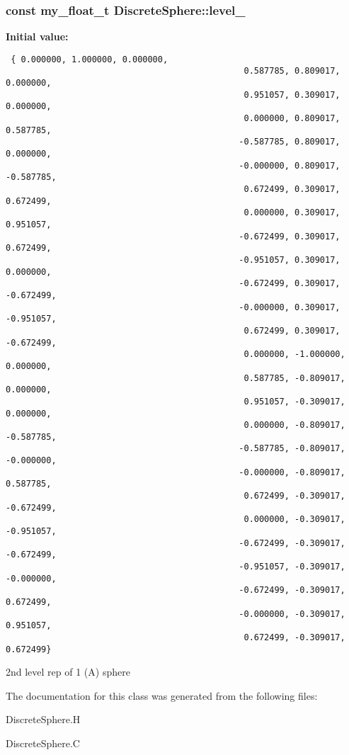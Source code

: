 \subsubsection{\setlength{\rightskip}{0pt plus 5cm}const my\_\-float\_\-t \bf{Discrete\-Sphere::level\_}\hspace{0.3cm}{\tt  [static, private]}}\label{classASCbase_1_1DiscreteSphere_e3e514caf92b337aae7cb629d90f9a61}


\textbf{Initial value:}

\begin{Code}\begin{verbatim} { 0.000000, 1.000000, 0.000000,
                                               0.587785, 0.809017, 0.000000,
                                               0.951057, 0.309017, 0.000000,
                                               0.000000, 0.809017, 0.587785,
                                              -0.587785, 0.809017, 0.000000,
                                              -0.000000, 0.809017, -0.587785,
                                               0.672499, 0.309017, 0.672499,
                                               0.000000, 0.309017, 0.951057,
                                              -0.672499, 0.309017, 0.672499,
                                              -0.951057, 0.309017, 0.000000,
                                              -0.672499, 0.309017, -0.672499,
                                              -0.000000, 0.309017, -0.951057,
                                               0.672499, 0.309017, -0.672499,
                                               0.000000, -1.000000, 0.000000,
                                               0.587785, -0.809017, 0.000000,
                                               0.951057, -0.309017, 0.000000,
                                               0.000000, -0.809017, -0.587785,
                                              -0.587785, -0.809017, -0.000000,
                                              -0.000000, -0.809017, 0.587785,
                                               0.672499, -0.309017, -0.672499,
                                               0.000000, -0.309017, -0.951057,
                                              -0.672499, -0.309017, -0.672499,
                                              -0.951057, -0.309017, -0.000000,
                                              -0.672499, -0.309017, 0.672499,
                                              -0.000000, -0.309017, 0.951057,
                                               0.672499, -0.309017, 0.672499}
\end{verbatim}\end{Code}
2nd level rep of 1 (A) sphere 



The documentation for this class was generated from the following files:\begin{CompactItemize}
\item 
Discrete\-Sphere.H\item 
Discrete\-Sphere.C\end{CompactItemize}

